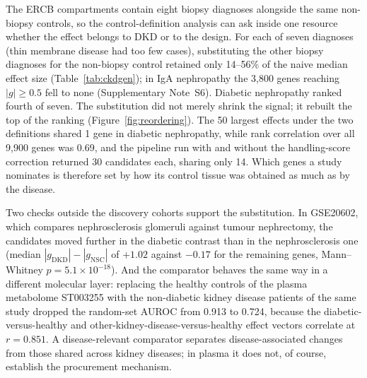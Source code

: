 \documentclass[unnumsec,webpdf,contemporary,large,numbered]{oup-authoring-template}
\begin{document}
The ERCB compartments contain eight biopsy diagnoses alongside the same non-biopsy controls, so
the control-definition analysis can ask inside one resource whether the effect belongs to DKD or to
the design. For each of seven diagnoses (thin membrane disease had too few cases), substituting
the other biopsy diagnoses for the non-biopsy control retained only 14--56\% of the naive median
effect size (Table~\ref{tab:ckdgen}); in IgA nephropathy the 3,800 genes reaching $|g| \ge 0.5$ fell to none
(Supplementary Note~S6). Diabetic nephropathy ranked fourth of seven. The substitution did not
merely shrink the signal; it rebuilt the top of the ranking (Figure~\ref{fig:reordering}). The 50
largest effects under the two definitions shared 1 gene in diabetic nephropathy, while rank
correlation over all 9,900 genes was 0.69, and the pipeline run with and without the handling-score
correction returned 30 candidates each, sharing only 14. Which genes a study nominates is
therefore set by how its control tissue was obtained as much as by the disease.

Two checks outside the discovery cohorts support the substitution. In GSE20602, which compares
nephrosclerosis glomeruli against tumour nephrectomy, the candidates moved further in the
diabetic contrast than in the nephrosclerosis one (median $|g_{\text{DKD}}| - |g_{\text{NSC}}|$ of
$+1.02$ against $-0.17$ for the remaining genes, Mann--Whitney $p = 5.1 \times 10^{-18}$). And the
comparator behaves the same way in a different molecular layer: replacing the healthy controls of
the plasma metabolome ST003255 with the non-diabetic kidney disease patients of the same study
dropped the random-set AUROC from 0.913 to 0.724, because the diabetic-versus-healthy and
other-kidney-disease-versus-healthy effect vectors correlate at $r = 0.851$. A disease-relevant
comparator separates disease-associated changes from those shared across kidney diseases; in
plasma it does not, of course, establish the procurement mechanism.
\end{document}
